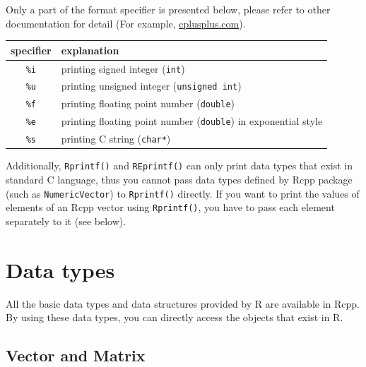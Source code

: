 \documentclass[
]{book}
\newenvironment{Shaded}{\begin{snugshade}}{\end{snugshade}}
\newcommand{\CommentTok}[1]{\textcolor[rgb]{0.56,0.35,0.01}{\textit{#1}}}
\newcommand{\ControlFlowTok}[1]{\textcolor[rgb]{0.13,0.29,0.53}{\textbf{#1}}}
\newcommand{\DataTypeTok}[1]{\textcolor[rgb]{0.13,0.29,0.53}{#1}}
\newcommand{\DecValTok}[1]{\textcolor[rgb]{0.00,0.00,0.81}{#1}}
\newcommand{\NormalTok}[1]{#1}
\newcommand{\SpecialCharTok}[1]{\textcolor[rgb]{0.00,0.00,0.00}{#1}}
\newcommand{\StringTok}[1]{\textcolor[rgb]{0.31,0.60,0.02}{#1}}
\begin{document}
Only a part of the format specifier is presented below, please refer to other documentation for detail (For example, \href{http://www.cplusplus.com/reference/cstdio/printf/}{cplusplus.com}).

\begin{longtable}[]{@{}cl@{}}
\toprule
specifier & explanation\tabularnewline
\midrule
\endhead
\texttt{\%i} & printing signed integer (\texttt{int})\tabularnewline
\texttt{\%u} & printing unsigned integer (\texttt{unsigned\ int})\tabularnewline
\texttt{\%f} & printing floating point number (\texttt{double})\tabularnewline
\texttt{\%e} & printing floating point number (\texttt{double}) in exponential style\tabularnewline
\texttt{\%s} & printing C string (\texttt{char*})\tabularnewline
\bottomrule
\end{longtable}

Additionally, \texttt{Rprintf()} and \texttt{REprintf()} can only print data types that exist in standard C language, thus you cannot pass data types defined by Rcpp package (such as \texttt{NumericVector}) to \texttt{Rprintf()} directly. If you want to print the values of elements of an Rcpp vector using \texttt{Rprintf()}, you have to pass each element separately to it (see below).

\begin{Shaded}
\end{Shaded}

\hypertarget{data-types}{%
\chapter{Data types}\label{data-types}}

All the basic data types and data structures provided by R are available in Rcpp. By using these data types, you can directly access the objects that exist in R.

\hypertarget{vector-and-matrix}{%
\section{Vector and Matrix}\label{vector-and-matrix}}
\end{document}
